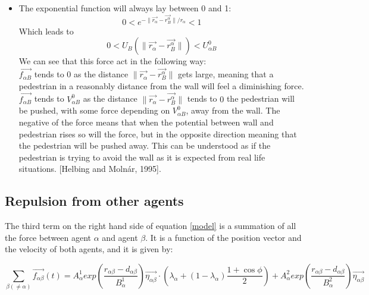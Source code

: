 \begin{itemize}
\item The exponential function will always lay between 0 and 1:
\begin{equation}
0 < e^{ -\| \vec{r_{\alpha}} - \vec{r_{B}^{\alpha}} \| /r_\alpha} < 1
\end{equation}
Which leads to
\begin{equation}
0< U_{B} \left( \| \vec{r_{\alpha}} - \vec{r_{B}^{\alpha}} \| \right) < U^0_{\alpha B}
\end{equation}
We can see that this force act in the following way:\\
$\vec{f_{\alpha B}}$ tends to 0 as the distance $ \| \vec{r_{\alpha}} - \vec{r_{B}^{\alpha}} \|$ gets large, meaning that a pedestrian in a reasonably distance from the wall will feel a diminishing force. $\vec{f_{\alpha B}}$ tends to $V^0_{\alpha B}$ as the distance $ \| \vec{r_{\alpha}} - \vec{r_{B}^{\alpha}} \|$ tends to $0$ the pedestrian will be pushed, with some force depending on $V^0_{\alpha B}$, away from the wall. 
The negative of the force means that when the potential between wall and pedestrian rises so will the force, but in the opposite direction meaning that the pedestrian will be pushed away. This can be understood as if the pedestrian is trying to avoid the wall as it is expected from real life situations.
 [Helbing and Molnár, 1995]. %
\end{itemize}


\subsection{Repulsion from other agents}
The third term on the right hand side of equation \eqref{model} is a summation of all the 
force between agent $\alpha$ and agent $\beta$. It is a function of the position vector and the velocity of 
both agents, and it is given by:

\begin{equation}
    \sum_{\beta \left( \neq \alpha \right)}
        \vec{f_{\alpha \beta }}\left( t \right) =
        A_{\alpha}^{1} exp \left(
            \frac{ r_{\alpha \beta} - d_{\alpha \beta }}
                 {B_{\alpha}^1}
        \right)
    \vec{\eta_{\alpha \beta}} \cdot
    \left(
        \lambda_{\alpha} + \left(
            1 - \lambda_{\alpha}
        \right)
		\frac{1+\cos{\phi}}{2}
    \right) +
    A_{\alpha}^{2} exp\left(
        \frac{r_{\alpha \beta} - d_{\alpha \beta}}
             {B_{\alpha}^{2}}
    \right)
    \vec{\eta_{\alpha \beta}}
    \label{agentinteraction}
\end{equation}

